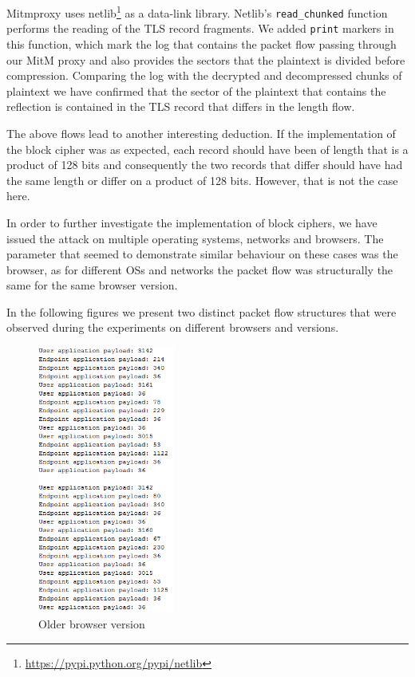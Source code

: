 Mitmproxy uses netlib\footnote{\url{https://pypi.python.org/pypi/netlib}} as a
data-link library. Netlib's \texttt{read\_chunked} function performs the reading
of the TLS record fragments. We added \texttt{print} markers in this function,
which mark the log that contains the packet flow passing through our MitM proxy
and also provides the sectors that the plaintext is divided before compression.
Comparing the log with the decrypted and decompressed chunks of plaintext we
have confirmed that the sector of the plaintext that contains the reflection is
contained in the TLS record that differs in the length flow.

The above flows lead to another interesting deduction. If the implementation of
the block cipher was as expected, each record should have been of length that is
a product of 128 bits and consequently the two records that differ should have
had the same length or differ on a product of 128 bits. However, that is
not the case here.

In order to further investigate the implementation of block ciphers, we have
issued the attack on multiple operating systems, networks and browsers. The
parameter that seemed to demonstrate similar behaviour on these cases was the
browser, as for different OSs and networks the packet flow was structurally the
same for the same browser version.

In the following figures we present two distinct packet flow structures that
were observed during the experiments on different browsers and versions.

\begin{figure}[H] \caption{Older browser version} \centering
\includegraphics[width=0.4\textwidth]{diagrams/older_browser_version.png}\end{figure}

